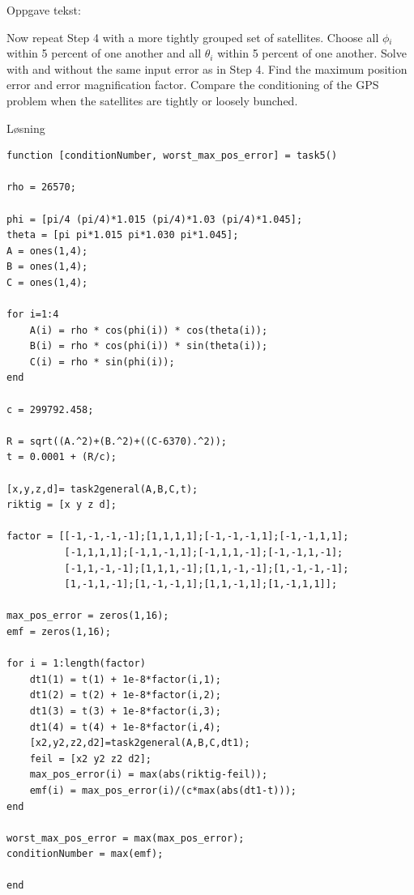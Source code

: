 % 

Oppgave tekst: 

Now repeat Step 4 with a more tightly grouped set of satellites. Choose all $\phi$$_i$ within
5 percent of one another and all $\theta$$_i$ within 5 percent of one another. Solve with and without the same input error as in Step 4. Find the maximum position error and error magnification factor. Compare the conditioning of the GPS problem when the satellites are tightly or loosely bunched.

\vspace{5mm}
Løsning

\begin{lstlisting}[caption={Task3.m}]
function [conditionNumber, worst_max_pos_error] = task5()

rho = 26570;

phi = [pi/4 (pi/4)*1.015 (pi/4)*1.03 (pi/4)*1.045];
theta = [pi pi*1.015 pi*1.030 pi*1.045];
A = ones(1,4); 
B = ones(1,4); 
C = ones(1,4);

for i=1:4
    A(i) = rho * cos(phi(i)) * cos(theta(i));
    B(i) = rho * cos(phi(i)) * sin(theta(i));
    C(i) = rho * sin(phi(i));
end

c = 299792.458;

R = sqrt((A.^2)+(B.^2)+((C-6370).^2));
t = 0.0001 + (R/c);

[x,y,z,d]= task2general(A,B,C,t); 
riktig = [x y z d];

factor = [[-1,-1,-1,-1];[1,1,1,1];[-1,-1,-1,1];[-1,-1,1,1];
		  [-1,1,1,1];[-1,1,-1,1];[-1,1,1,-1];[-1,-1,1,-1];
		  [-1,1,-1,-1];[1,1,1,-1];[1,1,-1,-1];[1,-1,-1,-1];
		  [1,-1,1,-1];[1,-1,-1,1];[1,1,-1,1];[1,-1,1,1]];

max_pos_error = zeros(1,16);
emf = zeros(1,16);

for i = 1:length(factor)
    dt1(1) = t(1) + 1e-8*factor(i,1);
    dt1(2) = t(2) + 1e-8*factor(i,2);
    dt1(3) = t(3) + 1e-8*factor(i,3);
    dt1(4) = t(4) + 1e-8*factor(i,4); 
    [x2,y2,z2,d2]=task2general(A,B,C,dt1);
    feil = [x2 y2 z2 d2];
    max_pos_error(i) = max(abs(riktig-feil));
    emf(i) = max_pos_error(i)/(c*max(abs(dt1-t)));
end

worst_max_pos_error = max(max_pos_error);
conditionNumber = max(emf);

end
\end{lstlisting}

